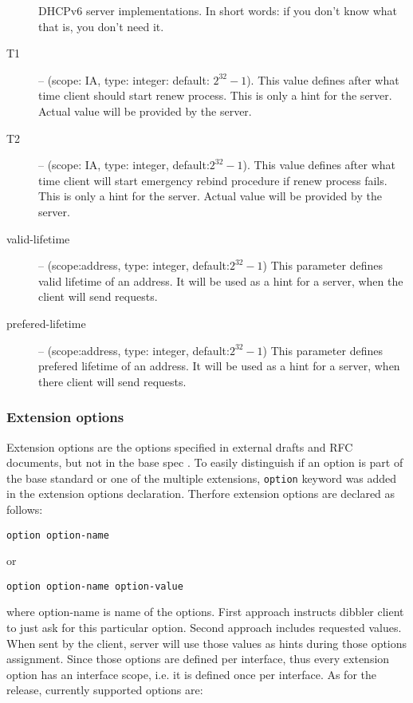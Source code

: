 \begin{description}
	    DHCPv6 server implementations. In short words: if you don't
	    know what that is, you don't need it.
 \item[T1] -- (scope: IA, type: integer: default: $2^{32}-1$). This value
	    defines after what time client should start renew
	    process. This is only a hint for the server. Actual value
	    will be provided by the server.
 \item[T2] -- (scope: IA, type: integer, default:$2^{32}-1$). This value
	    defines after what time client will start emergency rebind
	    procedure if renew process fails. This is only a hint for
	    the server. Actual value will be provided by the server.
 \item[valid-lifetime] -- (scope:address, type: integer,
	    default:$2^{32}-1$) This parameter defines valid lifetime of
	    an address. It will be used as a hint for a server, when the
	    client will send requests.
 \item[prefered-lifetime] -- (scope:address, type: integer,
	    default:$2^{32}-1$) This parameter defines prefered lifetime
	    of an address. It will be used as a hint for a server, when
	    there client will send requests.
\end{description}

\subsubsection{Extension options}
Extension options are the options specified in external drafts and RFC
documents, but not in the base spec \cite{rfc3315}. To easily
distinguish if an option is part of the base standard or one of the
multiple extensions, \verb+option+ keyword was added in the extension
options declaration. Therfore extension options are declared as follows:

\begin{verbatim}
option option-name
\end{verbatim}

or

\begin{verbatim}
option option-name option-value
\end{verbatim}

where option-name is name of the options. First approach instructs
dibbler client to just ask for this particular option. Second approach
includes requested values. When sent by the client, server will use
those values as hints during those options assignment. Since those
options are defined per interface, thus every extension option has an
interface scope, i.e. it is defined once per interface. As for the
\version release, currently supported options are:

